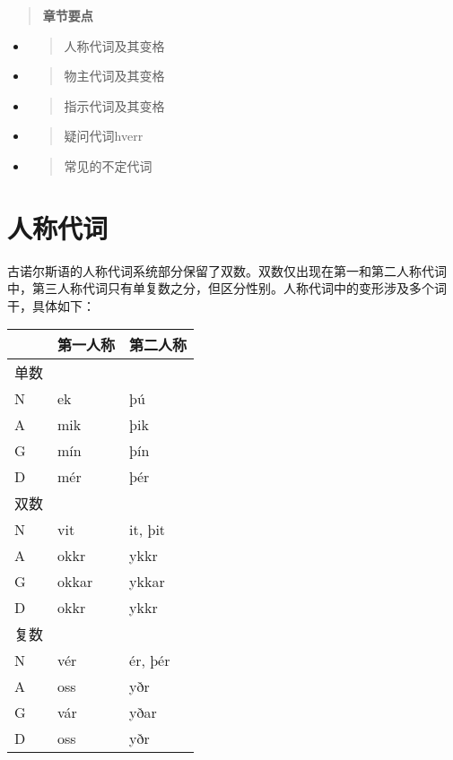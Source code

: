 \begin{quote}
  \textbf{章节要点}
\end{quote}

\begin{itemize}
  \item
        \begin{quote}
          人称代词及其变格
        \end{quote}
  \item
        \begin{quote}
          物主代词及其变格
        \end{quote}
  \item
        \begin{quote}
          指示代词及其变格
        \end{quote}
  \item
        \begin{quote}
          疑问代词hverr
        \end{quote}
  \item
        \begin{quote}
          常见的不定代词
        \end{quote}
\end{itemize}

\section{人称代词}\label{人称代词}

古诺尔斯语的人称代词系统部分保留了双数。双数仅出现在第一和第二人称代词中，第三人称代词只有单复数之分，但区分性别。人称代词中的变形涉及多个词干，具体如下：

\begin{longtable}{lll}
  \toprule
     & 第一人称  & 第二人称    \\
  \midrule
  \endhead
  \bottomrule
  \endfoot
  单数 &       &         \\
  N  & ek    & þú      \\
  A  & mik   & þik     \\
  G  & mín   & þín     \\
  D  & mér   & þér     \\
  双数 &       &         \\
  N  & vit   & it, þit \\
  A  & okkr  & ykkr    \\
  G  & okkar & ykkar   \\
  D  & okkr  & ykkr    \\
  复数 &       &         \\
  N  & vér   & ér, þér \\
  A  & oss   & yðr     \\
  G  & vár   & yðar    \\
  D  & oss   & yðr     \\
\end{longtable}

